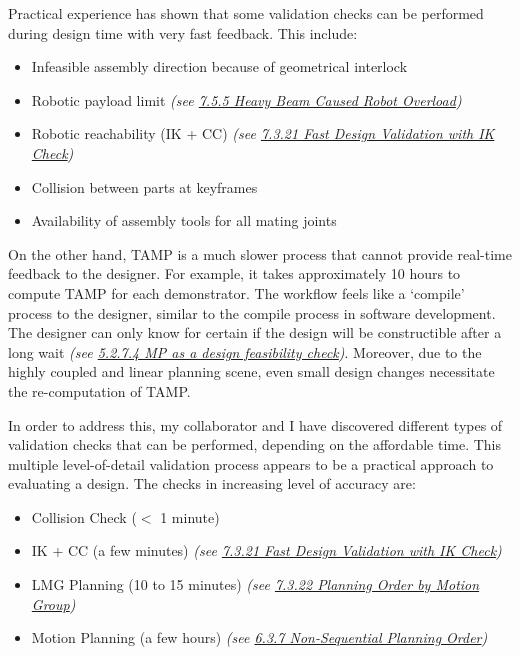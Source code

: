 Practical experience has shown that some validation checks can be performed during design time with very fast feedback. This include: 

\begin{itemize}
	\item Infeasible assembly direction because of geometrical interlock

	\item Robotic payload limit \textit{(see \ul{7.5.5 Heavy Beam Caused Robot Overload})}

	\item Robotic reachability (IK + CC) \textit{(see \ul{7.3.21 Fast Design Validation with IK Check})}

	\item Collision between parts at keyframes

	\item Availability of assembly tools for all mating joints

\end{itemize}

On the other hand, TAMP is a much slower process that cannot provide real-time feedback to the designer. For example, it takes approximately 10 hours to compute TAMP for each demonstrator. The workflow feels like a ‘compile’ process to the designer, similar to the compile process in software development. The designer can only know for certain if the design will be constructible after a long wait \textit{(see \ul{5.2.7.4 MP as a design feasibility check})}. Moreover, due to the highly coupled and linear planning scene, even small design changes necessitate the re-computation of TAMP.

In order to address this, my collaborator and I have discovered different types of validation checks that can be performed, depending on the affordable time. This multiple level-of-detail validation process appears to be a practical approach to evaluating a design. The checks in increasing level of accuracy are:

\begin{itemize}
	\item Collision Check ($<$ 1 minute)

	\item IK + CC (a few minutes) \textit{(see \ul{7.3.21 Fast Design Validation with IK Check})}

	\item LMG Planning (10 to 15 minutes) \textit{(see \ul{7.3.22 Planning Order by Motion Group})}

	\item Motion Planning (a few hours) \textit{(see \ul{6.3.7 Non-Sequential Planning Order})}

\end{itemize}

